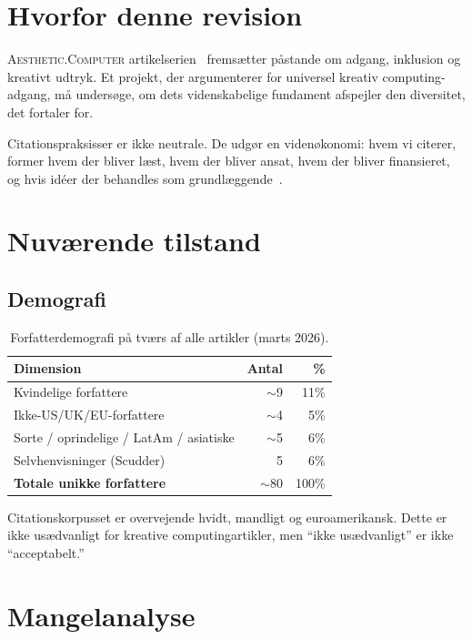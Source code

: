 \documentclass[10pt,letterpaper,twocolumn]{article}
\newcommand{\ac}{\textsc{Aesthetic.Computer}}
\begin{document}
\section{Hvorfor denne revision}

\ac{} artikelserien~\citep{scudder2026ac, scudder2026kidlisp, scudder2026acos, scudder2026pieces, scudder2026notepat} fremsætter påstande om adgang, inklusion og kreativt udtryk. Et projekt, der argumenterer for universel kreativ computing-adgang, må undersøge, om dets videnskabelige fundament afspejler den diversitet, det fortaler for.

Citationspraksisser er ikke neutrale. De udgør en videnøkonomi: hvem vi citerer, former hvem der bliver læst, hvem der bliver ansat, hvem der bliver finansieret, og hvis idéer der behandles som grundlæggende~\citep{benjamin2019race}.

\section{Nuværende tilstand}

\subsection{Demografi}

\begin{table}[h]
\small\centering
\begin{tabular}{lrr}
\toprule
\textbf{Dimension} & \textbf{Antal} & \textbf{\%} \\
\midrule
Kvindelige forfattere & $\sim$9 & 11\% \\
Ikke-US/UK/EU-forfattere & $\sim$4 & 5\% \\
Sorte / oprindelige / LatAm / asiatiske & $\sim$5 & 6\% \\
Selvhenvisninger (Scudder) & 5 & 6\% \\
\midrule
\textbf{Totale unikke forfattere} & $\sim$80 & 100\% \\
\bottomrule
\end{tabular}
\caption{Forfatterdemografi på tværs af alle artikler (marts 2026).}
\label{tab:demographics}
\end{table}

Citationskorpusset er overvejende hvidt, mandligt og euroamerikansk. Dette er ikke usædvanligt for kreative computingartikler, men ``ikke usædvanligt'' er ikke ``acceptabelt.''

\section{Mangelanalyse}
\end{document}
